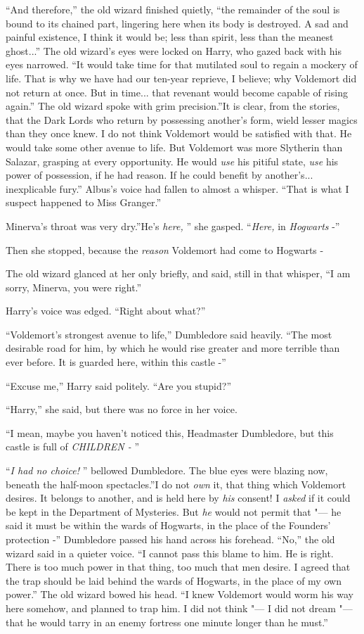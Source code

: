 ``And therefore,'' the old wizard finished quietly, ``the remainder of
the soul is bound to its chained part, lingering here when its body is
destroyed. A sad and painful existence, I think it would be; less than
spirit, less than the meanest ghost...'' The old wizard's eyes were
locked on Harry, who gazed back with his eyes narrowed. ``It would take
time for that mutilated soul to regain a mockery of life. That is why we
have had our ten-year reprieve, I believe; why Voldemort did not return
at once. But in time... that revenant would become capable of
rising again.'' The old wizard spoke with grim precision.''It is clear,
from the stories, that the Dark Lords who return by possessing another's
form, wield lesser magics than they once knew. I do not think Voldemort
would be satisfied with that. He would take some other avenue to life.
But Voldemort was more Slytherin than Salazar, grasping at every
opportunity. He would \emph{use} his pitiful state, \emph{use} his power
of possession, if he had reason. If he could benefit by
another's... inexplicable fury.'' Albus's voice had fallen to
almost a whisper. ``That is what I suspect happened to Miss Granger.''

Minerva's throat was very dry.''He's \emph{here,} '' she gasped.
``\emph{Here,} in \emph{Hogwarts} -''

Then she stopped, because the \emph{reason} Voldemort had come to
Hogwarts -

The old wizard glanced at her only briefly, and said, still in that
whisper, ``I am sorry, Minerva, you were right.''

Harry's voice was edged. ``Right about what?''

``Voldemort's strongest avenue to life,'' Dumbledore said heavily. ``The
most desirable road for him, by which he would rise greater and more
terrible than ever before. It is guarded here, within this castle -''

``Excuse me,'' Harry said politely. ``Are you stupid?''

``Harry,'' she said, but there was no force in her voice.

``I mean, maybe you haven't noticed this, Headmaster Dumbledore, but this
castle is full of \emph{CHILDREN -} ''

``\emph{I had no choice!} '' bellowed Dumbledore. The blue eyes were
blazing now, beneath the half-moon spectacles.''I do not \emph{own} it,
that thing which Voldemort desires. It belongs to another, and is held
here by \emph{his} consent! I \emph{asked} if it could be kept in the
Department of Mysteries. But \emph{he} would not permit that "--- he said
it must be within the wards of Hogwarts, in the place of the Founders'
protection -'' Dumbledore passed his hand across his forehead. ``No,''
the old wizard said in a quieter voice. ``I cannot pass this blame to
him. He is right. There is too much power in that thing, too much that
men desire. I agreed that the trap should be laid behind the wards of
Hogwarts, in the place of my own power.'' The old wizard bowed his head.
``I knew Voldemort would worm his way here somehow, and planned to trap
him. I did not think "--- I did not dream "--- that he would tarry in an enemy
fortress one minute longer than he must.''

